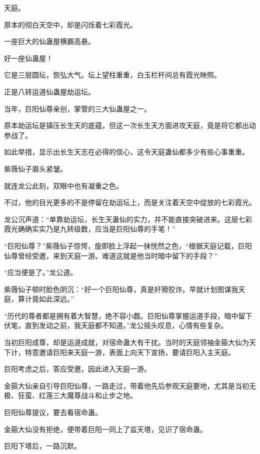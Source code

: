 
\begin{this_body}

天庭。

原本的彻白天空中，却是闪烁着七彩霞光。

一座巨大的仙蛊屋横霸高悬。

好一座仙蛊屋！

它是三层圆坛，恢弘大气。坛上望柱重重，白玉栏杆间总有霞光映照。

正是八转运道仙蛊屋劫运坛。

当年，巨阳仙尊亲创，掌管的三大仙蛊屋之一。

原本劫运坛是镇压长生天的底蕴，但这一次长生天方面进攻天庭，竟是将它都出动参战了。

如此举措，显示出长生天志在必得的信心，这令天庭蛊仙都多少有些心事重重。

紫薇仙子眉头紧皱。

就连龙公此刻，双眼中也有凝重之色。

不过，他的目光更多的不是停留在劫运坛上，而是关注着天空中绽放的七彩霞光。

龙公沉声道：“单靠劫运坛，长生天蛊仙的实力，并不能直接突破进来。这层七彩霞光确确实实乃是九转级数，应当是巨阳仙尊的手笔！”

“巨阳仙尊？”紫薇仙子惊愕，旋即脸上浮起一抹恍然之色，“根据天庭记载，巨阳仙尊曾经受邀，来到天庭一游。难道这就是他当时暗中留下的手段？”

“应当便是了。”龙公道。

紫薇仙子顿时脸色阴沉：“好一个巨阳仙尊，真是奸猾狡诈。早就计划图谋我天庭，算计竟如此深远。”

“历代的尊者都是拥有着大智慧，绝不容小觑。巨阳仙尊掌握运道手段，暗中留下伏笔，直到发动之前，我天庭都不知道。”龙公摇头叹息，心情有些复杂。

当初巨阳成尊，却是运道成就，对宿命蛊大有干扰。当时的天庭领袖金箍大仙为天下计，特意邀请巨阳来天庭一游，表面上向天下宣扬，要请巨阳入主天庭。

巨阳考虑之后，答应受邀，因此进入天庭一游。

金箍大仙亲自引导巨阳仙尊，一路走过，带着他先后参观天庭要地，尤其是当初无极、狂蛮、红莲三大魔尊战斗和止步之地。

巨阳仙尊提议，要去看宿命蛊。

金箍大仙没有拒绝，便带着巨阳一同上了监天塔，见识了宿命蛊。

巨阳下塔后，一路沉默。


\end{this_body}
